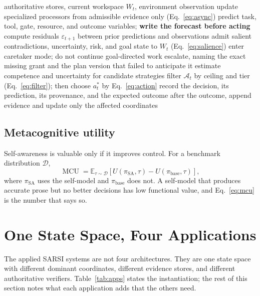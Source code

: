 \documentclass[11pt]{article}
\newcommand{\op}[1]{\operatorname{#1}}
\begin{document}
\begin{algorithm}[t]
\caption{Brain-inspired SARSI metacognitive pass}
\label{alg:pass}
\begin{algorithmic}[1]
\Require authoritative stores, current workspace $W_t$, environment observation
\State update specialized processors from admissible evidence only (Eq.~\ref{eq:async})
\State predict task, tool, gate, resource, and outcome variables; \textbf{write the forecast before acting}
\State compute residuals $\varepsilon_{t+1}$ between prior predictions and observations
\State admit salient contradictions, uncertainty, risk, and goal state to $W_t$ (Eq.~\ref{eq:salience})
  \State enter caretaker mode; do not continue goal-directed work
\EndIf
{}
  \State escalate, naming the exact missing grant and the plan version that failed to anticipate it
\EndIf
\State estimate competence and uncertainty for candidate strategies
\State filter $\mathcal{A}_t$ by ceiling and tier (Eq.~\ref{eq:filter}); then choose $a^*_t$ by Eq.~\eqref{eq:action}
\State record the decision, its prediction, its provenance, and the expected outcome
\State after the outcome, append evidence and update only the affected coordinates
\end{algorithmic}
\end{algorithm}

\subsection{Metacognitive utility}
Self-awareness is valuable only if it improves control. For a benchmark distribution $\mathcal{D}$,
\begin{equation}
\op{MCU} = \mathbb{E}_{\tau \sim \mathcal{D}}\left[U(\pi_{\mathrm{SA}}, \tau) - U(\pi_{\mathrm{base}}, \tau)\right],
\label{eq:mcu}
\end{equation}
where $\pi_{\mathrm{SA}}$ uses the self-model and $\pi_{\mathrm{base}}$ does not. A self-model that produces accurate prose but no better decisions has low functional value, and Eq.~\eqref{eq:mcu} is the number that says so.

\section{One State Space, Four Applications}
\label{sec:applications}

The applied SARSI systems are not four architectures. They are one state space with different dominant coordinates, different evidence stores, and different authoritative verifiers. Table~\ref{tab:apps} states the instantiation; the rest of this section notes what each application adds that the others need.
\end{document}

